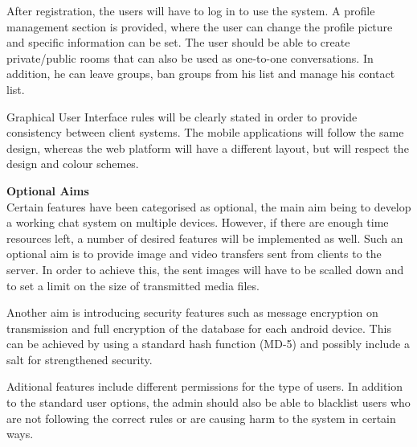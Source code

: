 \documentclass{article}
\begin{document}
	After registration, the users will have to log in to use the system. A profile management section is provided, where the user can change the profile picture and specific information can be set. The user should be able to create private/public rooms that can also be used as one-to-one conversations. In addition, he can leave groups, ban groups from his list and manage his contact list.  \\\par
	Graphical User Interface rules will be clearly stated in order to provide consistency between client systems. The mobile applications will follow the same design, whereas the web platform will have a different layout, but will respect the design and colour schemes. \\\par
	
	\textbf{Optional Aims} \\ \newline
	Certain features have been categorised as optional, the main aim being to develop a working chat system on multiple devices. However, if there are enough time resources left, a number of desired features will be implemented as well. Such an optional aim is to provide image and video transfers sent from clients to the server. In order to achieve this, the sent images will have to be scalled down and to set a limit on the size of transmitted media files.\\ \par
	Another aim is introducing security features such as message encryption on transmission and full encryption of the database for each android device. This can be achieved by using a standard hash function (MD-5) and possibly include a salt for strengthened security.\\ \par
	Aditional features include different permissions for the type of users. In addition to the standard user options, the admin should also be able to blacklist users who are not following the correct rules or are causing harm to the system in certain ways.   \newline
	\newpage
	
\end{document}
